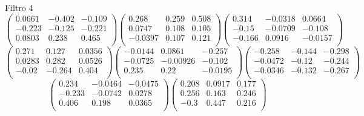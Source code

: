 Filtro 4
{ \small
\[
\begin{pmatrix}
  0.0661 & -0.402 & -0.109 \\
  -0.223 & -0.125 & -0.221 \\
  0.0803 & 0.238 & 0.465 \\
\end{pmatrix}
\begin{pmatrix}
  0.268 & 0.259 & 0.508 \\
  0.0747 & 0.108 & 0.105 \\
  -0.0397 & 0.107 & 0.121 \\
\end{pmatrix}
\begin{pmatrix}
  0.314 & -0.0318 & 0.0664 \\
  -0.15 & -0.0709 & -0.108 \\
  -0.166 & 0.0916 & -0.0157 \\
\end{pmatrix}
\]
\[
\begin{pmatrix}
  0.271 & 0.127 & 0.0356 \\
  0.0283 & 0.282 & 0.0526 \\
  -0.02 & -0.264 & 0.404 \\
\end{pmatrix}
\begin{pmatrix}
  -0.0144 & 0.0861 & -0.257 \\
  -0.0725 & -0.00926 & -0.102 \\
  0.235 & 0.22 & -0.0195 \\
\end{pmatrix}
\begin{pmatrix}
  -0.258 & -0.144 & -0.298 \\
  -0.0472 & -0.12 & -0.244 \\
  -0.0346 & -0.132 & -0.267 \\
\end{pmatrix}
\]
\[
\begin{pmatrix}
  0.234 & -0.0464 & -0.0475 \\
  -0.233 & -0.0742 & 0.0278 \\
  0.406 & 0.198 & 0.0365 \\
\end{pmatrix}
\begin{pmatrix}
  0.208 & 0.0917 & 0.177 \\
  0.256 & 0.163 & 0.246 \\
  -0.3 & 0.447 & 0.216 \\
\end{pmatrix}
\]
}

